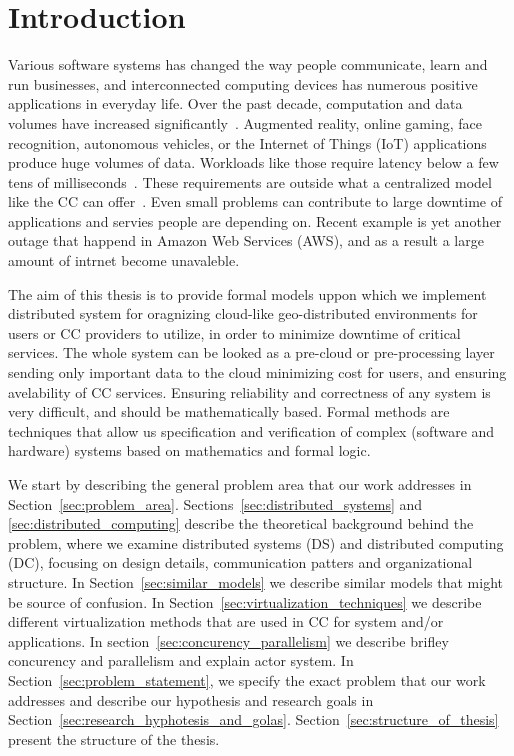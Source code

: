 \pagestyle{fancy}
\fancyhf{}
\fancyhead[RE,LO]{\leftmark}
\fancyfoot[CE,CO]{\thepage}
\chapter{Introduction}\label{chapter:Intro}
%
Various software systems has changed the way people communicate, learn and run businesses, and interconnected computing devices has numerous positive applications in everyday life. Over the past decade, computation and data volumes have increased significantly~\cite{ChiangZ16}. Augmented reality, online gaming, face recognition, autonomous vehicles, or the Internet of Things (IoT) applications produce huge volumes of data. Workloads like those require latency below a few tens of milliseconds~\cite{ChiangZ16}. These requirements are outside what a centralized model like the CC can offer~\cite{ChiangZ16}. Even small problems can contribute to large downtime of applications and servies people are depending on. Recent example is yet another outage that happend in Amazon Web Services (AWS), and as a result a large amount of intrnet become unavaleble.

The aim of this thesis is to provide formal models uppon which we implement distributed system for oragnizing cloud-like geo-distributed environments for users or CC providers to utilize, in order to minimize downtime of critical services. The whole system can be looked as a pre-cloud or pre-processing layer sending only important data to the cloud minimizing cost for users, and ensuring avelability of CC services. Ensuring reliability and correctness of any system is very difficult, and should be mathematically based. Formal methods are techniques that allow us specification and verification of complex (software and hardware) systems based on mathematics and formal logic.

We start by describing the general problem area that our work addresses in Section~\ref{sec:problem_area}. Sections~\ref{sec:distributed_systems} and \ref{sec:distributed_computing} describe the theoretical background behind the problem, where we examine distributed systems (DS) and distributed computing (DC), focusing on design details, communication patters and organizational structure. In Section~\ref{sec:similar_models} we describe similar models that might be source of confusion. In Section~\ref{sec:virtualization_techniques} we describe different virtualization methods that are used in CC for system and/or applications. In section~\ref{sec:concurency_parallelism} we describe brifley concurency and parallelism and explain actor system. In Section~\ref{sec:problem_statement}, we specify the exact problem that our work addresses and describe our hypothesis and research goals in Section~\ref{sec:research_hyphotesis_and_golas}. Section~\ref{sec:structure_of_thesis} present the structure of the thesis.
%
%
%
